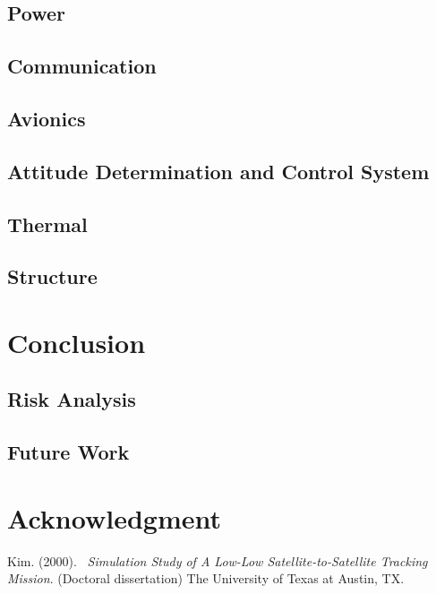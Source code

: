\documentclass[12pt]{article}
\begin{document}
		\subsection{Power}
		\subsection{Communication}
		\subsection{Avionics}
		\subsection{Attitude Determination and Control System}
		\subsection{Thermal}
		\subsection{Structure}
\section{Conclusion}
		\subsection{Risk Analysis}
		\subsection{Future Work}
\section{Acknowledgment}
	
	


\begin{thebibliography}{9}

   Kim. (2000).
  \emph{\ Simulation Study of A Low-Low Satellite-to-Satellite Tracking Mission}. (Doctoral dissertation)
  The University of Texas at Austin, TX.
 

\end{thebibliography}
\end{document}
